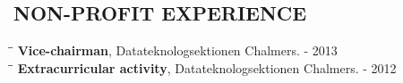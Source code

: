 \documentclass[11pt]{res}
\begin{document}
\begin{resume}
\section{NON-PROFIT EXPERIENCE}  
\vspace{-0.1in}	
	\begin{tabbing}
		\hspace{2.3in}\= \hspace{2.6in}\= \kill %
		{\bf  Vice-chairman}, Datateknologsektionen Chalmers. \>  - 2013\\
		\hspace{2.3in}\= \hspace{2.6in}\= \kill %
		{\bf  Extracurricular activity}, Datateknologsektionen Chalmers. \>  - 2012\\
		\\
	\end{tabbing}



\end{resume}
\end{document}
